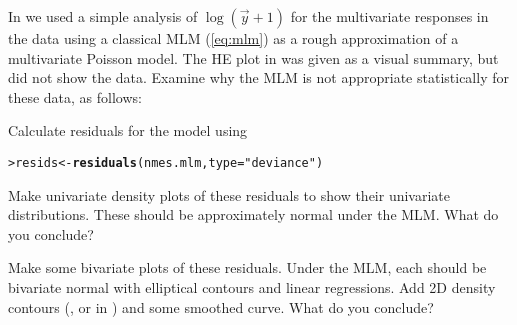 \documentclass[11pt]{report}\usepackage[]{graphicx}\usepackage[]{color}
\makeatletter
\newcommand{\hlstr}[1]{\textcolor[rgb]{0.192,0.494,0.8}{#1}}%
\newcommand{\hlstd}[1]{\textcolor[rgb]{0.345,0.345,0.345}{#1}}%
\newcommand{\hlkwb}[1]{\textcolor[rgb]{0.69,0.353,0.396}{#1}}%
\newcommand{\hlkwc}[1]{\textcolor[rgb]{0.333,0.667,0.333}{#1}}%
\newcommand{\hlkwd}[1]{\textcolor[rgb]{0.737,0.353,0.396}{\textbf{#1}}}%
\newenvironment{kframe}{%
 \def\at@end@of@kframe{}%
 \ifinner\ifhmode%
  \def\at@end@of@kframe{\end{minipage}}%
  \begin{minipage}{\columnwidth}%
 \fi\fi%
 \def\FrameCommand##1{\hskip\@totalleftmargin \hskip-\fboxsep
 \colorbox{shadecolor}{##1}\hskip-\fboxsep
     \hskip-\linewidth \hskip-\@totalleftmargin \hskip\columnwidth}%
 \MakeFramed {\advance\hsize-\width
   \@totalleftmargin\z@ \linewidth\hsize
   \@setminipage}}%
 {\par\unskip\endMakeFramed%
 \at@end@of@kframe}
\newenvironment{knitrout}{}{} %
\renewenvironment{knitrout}{\small\renewcommand{\baselinestretch}{.85}}{} %
\makeatother
\begin{document}
\begin{Exercises}
  \exercise In  we used a simple analysis of $\log(\vec{y}+1)$ for the multivariate responses
  in the  data using a classical MLM (\eqref{eq:mlm})
  as a rough approximation of a multivariate Poisson model.
  The HE plot in  was given as a visual summary, but did not show the data.
  Examine why the MLM is not appropriate statistically for these data, as follows:
  \begin{enumerate*}
    \item Calculate residuals for the model  using
\begin{knitrout}
\color{fgcolor}\begin{kframe}
\begin{alltt}
\hlstd{> }\hlstd{resids} \hlkwb{<-} \hlkwd{residuals}\hlstd{(nmes.mlm,} \hlkwc{type}\hlstd{=}\hlstr{"deviance"}\hlstd{)}
\end{alltt}
\end{kframe}
\end{knitrout}
    \item Make univariate density plots of these residuals to show their univariate distributions.
    These should be approximately normal under the MLM.  What do you conclude?
    \item Make some bivariate plots of these residuals. Under the MLM, each should be bivariate normal
    with elliptical contours and linear regressions. Add 2D density contours
    (, or  in ) and some smoothed curve.
     What do you conclude?

  \end{enumerate*}

\end{Exercises}

{\itemsep -2pt

}
\end{document}
